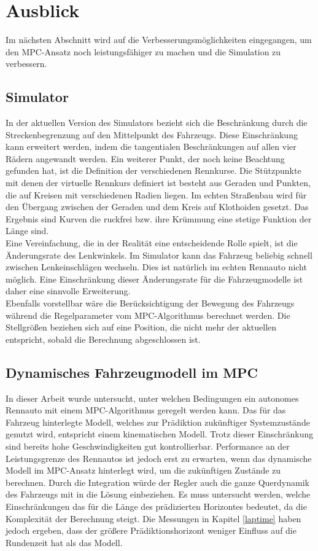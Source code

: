 \documentclass{like}
\begin{document}
\section{Ausblick}
Im nächsten Abschnitt wird auf die Verbesserungsmöglichkeiten eingegangen, um den \ac{MPC}-Ansatz noch leistungsfähiger zu machen und die Simulation zu verbessern.
\subsection{Simulator}
In der aktuellen Version des Simulators bezieht sich die Beschränkung durch die Strecken\-be\-gren\-zung auf den Mittelpunkt des Fahrzeugs. Diese Einschränkung kann erweitert werden, indem die tangentialen Beschränkungen auf allen vier Rädern angewandt werden. Ein weiterer Punkt, der noch keine Beachtung gefunden hat, ist die Definition der ver\-schie\-den\-en Rennkurse. Die Stützpunkte mit denen der virtuelle Rennkurs definiert ist besteht aus Geraden und Punkten, die auf Kreisen mit ver\-schie\-den\-en Radien liegen. Im echten Straßenbau wird für den Übergang zwischen der Geraden und dem Kreis auf Klothoiden gesetzt. Das Ergebnis sind Kurven die ruckfrei bzw. ihre Krümmung eine stetige Funktion der Länge sind. \\
Eine Vereinfachung, die in der Realität eine entscheidende Rolle spielt, ist die Änderungsrate des Lenkwinkels. Im Simulator kann das Fahrzeug beliebig schnell zwischen Lenk\-ein\-schlä\-gen wechseln. Dies ist natürlich im echten Rennauto nicht möglich. Eine Einschränkung dieser Änderungsrate für die Fahrzeugmodelle ist daher eine sinnvolle Erweiterung.\\
Ebenfalls vorstellbar wäre die Berücksichtigung der Bewegung des Fahrzeugs während die Regelparameter vom \ac{MPC}-Algorithmus berechnet werden. Die Stellgrößen beziehen sich auf eine Position, die nicht mehr der aktuellen entspricht, sobald die Berechnung abgeschlossen ist.

\subsection{Dynamisches Fahrzeugmodell im MPC}
In dieser Arbeit wurde untersucht, unter welchen Bedingungen ein autonomes Rennauto mit einem \ac{MPC}-Algorithmus geregelt werden kann. Das für das Fahrzeug hinterlegte Modell, welches zur Prädiktion zukünftiger Systemzustände genutzt wird, entspricht einem kinematischen Modell. Trotz dieser Einschränkung sind bereits hohe Geschwindigkeiten gut kontrollierbar. Performance an der Leistungsgrenze des Rennautos ist jedoch erst zu erwarten, wenn das dynamische Modell im \ac{MPC}-Ansatz hinterlegt wird, um die zukünftigen Zustände zu berechnen. Durch die Integration würde der Regler auch die ganze Querdynamik des Fahrzeugs mit in die Lösung einbeziehen. Es muss untersucht werden, welche Einschränkungen das für die Länge des prädizierten Horizontes bedeutet, da die Komplexität der Berechnung steigt. Die Messungen in Kapitel \ref{laptime} haben jedoch ergeben, dass der größere Prädiktionshorizont weniger Einfluss auf die Rundenzeit hat als das Modell.
\end{document}
